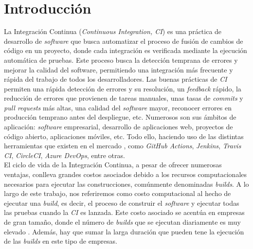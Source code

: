 \section{Introducción}
La Integración Continua (\textit{Continuous Integration, CI}) es una práctica de desarrollo de
\textit{software} que busca automatizar el proceso de fusión de cambios de código en un proyecto,
donde cada integración es verificada mediante la ejecución automática de pruebas. Este proceso
busca la detección temprana de errores y mejorar la calidad del software, permitiendo una
integración más frecuente y rápida del trabajo de todos los desarrolladores. Las buenas prácticas
de \textit{CI} \cite{8} permiten una rápida detección de errores y su resolución, un
\textit{feedback} rápido, la reducción de errores que provienen de tareas manuales, unas tasas de
\textit{commits} y \textit{pull requests} más altas, una calidad del \textit{software} mayor,
reconocer errores en producción temprano antes del despliegue, etc. Numerosos son sus ámbitos
de aplicación: \textit{software} empresarial, desarrollo de aplicaciones web, proyectos de código
abierto, aplicaciones móviles, etc. Todo ello, haciendo uso de las distintas herramientas que
existen en el mercado \cite{9}, como \textit{GitHub Actions}, \textit{Jenkins},
\textit{Travis CI}, \textit{CircleCI}, \textit{Azure DevOps}, entre otras.\\

El ciclo de vida de la Integración Continua, a pesar de ofrecer numerosas ventajas, conlleva
grandes costos asociados debido a los recursos computacionales \cite{10} necesarios para ejecutar
las construcciones, comúnmente denominadas \textit{builds}. A lo largo de este trabajo,
nos referiremos como costo computacional al hecho de ejecutar una \textit{build}, es decir, el
proceso de construir el \textit{software} y ejecutar todas las pruebas cuando la \textit{CI} es
lanzada. Este costo asociado se acentúa en empresas de gran tamaño, donde el número de
\textit{builds} que se ejecutan diariamente es muy elevado \cite{12,13}. Además, hay que sumar
la larga duración que pueden tene la ejecución de las \textit{builds} en este tipo de empresas.\\

